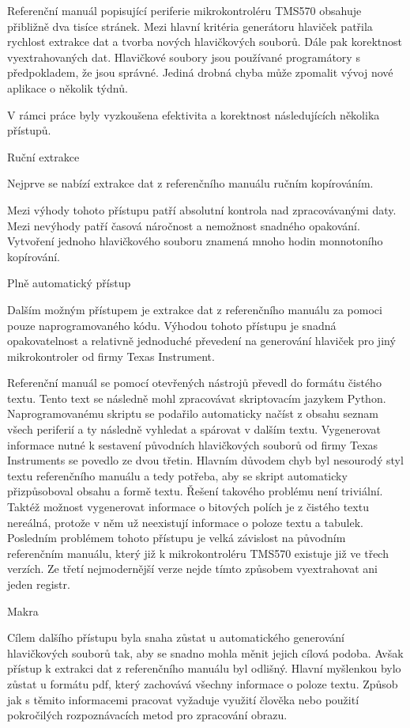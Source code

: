 Referenční manuál popisující periferie mikrokontroléru TMS570 obsahuje přibližně dva tisíce stránek.
Mezi hlavní kritéria generátoru hlaviček patřila rychlost extrakce dat a tvorba nových hlavičkových souborů.
Dále pak korektnost vyextrahovaných dat.
Hlavičkové soubory jsou používané programátory s předpokladem, že jsou správné.
Jediná drobná chyba může zpomalit vývoj nové aplikace o několik týdnů.

V rámci práce byly vyzkoušena efektivita a korektnost následujících několika přístupů.

\secc Ruční extrakce

	Nejprve se nabízí extrakce dat z referenčního manuálu ručním kopírováním.

Mezi výhody tohoto přístupu patří absolutní kontrola nad zpracovávanými daty.
Mezi nevýhody patří časová náročnost a nemožnost snadného opakování.
Vytvoření jednoho hlavičkového souboru znamená mnoho hodin monnotoního kopírování.

\secc Plně automatický přístup

	Dalším možným přístupem je extrakce dat z referenčního manuálu za pomoci pouze naprogramovaného kódu.
Výhodou tohoto přístupu je snadná opakovatelnost a relativně jednoduché převedení na generování hlaviček pro jiný mikrokontroler od firmy Texas Instrument.

Referenční manuál se pomocí otevřených nástrojů převedl do formátu čistého textu.
Tento text se následně mohl zpracovávat skriptovacím jazykem Python.
Naprogramovanému skriptu se podařilo automaticky načíst z obsahu seznam všech periferií a ty následně vyhledat a spárovat v dalším textu.
Vygenerovat informace nutné k sestavení původních hlavičkových souborů od firmy Texas Instruments se povedlo ze dvou třetin.
Hlavním důvodem chyb byl nesourodý styl textu referenčního manuálu a tedy potřeba, aby se skript automaticky přizpůsoboval obsahu a formě textu.
Řešení takového problému není triviální.
Taktéž možnost vygenerovat informace o bitových polích je z čistého textu nereálná, protože v něm už neexistují informace o poloze textu a tabulek.
Posledním problémem tohoto přístupu je velká závislost na původním referenčním manuálu, který již k mikrokontroléru TMS570 existuje již ve třech verzích.
Ze třetí nejmodernější verze nejde tímto způsobem vyextrahovat ani jeden registr.

\secc Makra

	Cílem dalšího přístupu byla snaha zůstat u automatického generování hlavičkových souborů tak, aby se snadno mohla měnit jejich cílová podoba.
Avšak přístup k extrakci dat z referenčního manuálu byl odlišný.
Hlavní myšlenkou bylo zůstat u formátu pdf, který zachovává všechny informace o poloze textu.
Způsob jak s těmito informacemi pracovat vyžaduje využití člověka nebo použití pokročilých rozpoznávacích metod pro zpracování obrazu.

